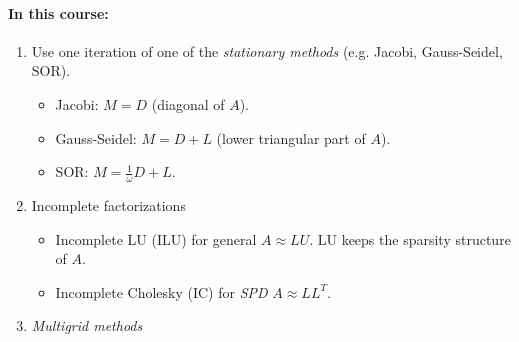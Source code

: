 \paragraph{In this course:}
\begin{enumerate}
    \item Use one iteration of one of the \emph{stationary methods} (e.g. Jacobi, Gauss-Seidel, SOR).
    \begin{itemize}
        \item Jacobi: $M = D$ (diagonal of $A$).
        \item Gauss-Seidel: $M = D + L$ (lower triangular part of $A$).
        \item SOR: $M = \frac{1}{\omega} D + L$.
    \end{itemize}
    \item Incomplete factorizations
            \begin{itemize}
                \item Incomplete LU (ILU) for general $A \approx LU$. LU keeps the sparsity structure of $A$.
                \item Incomplete Cholesky (IC) for \emph{SPD} $A \approx LL^T$.
            \end{itemize}
    \item \emph{Multigrid methods}
\end{enumerate}
